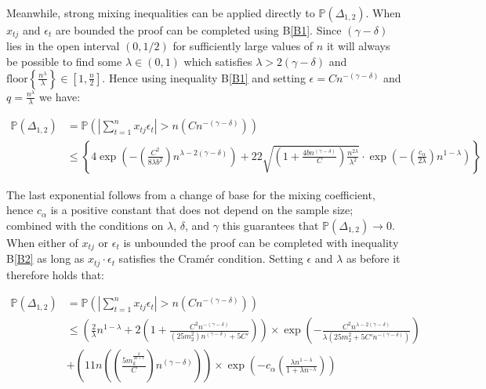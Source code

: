 \documentclass[11pt]{report}\usepackage[utf8]{inputenc}
\begin{document}
Meanwhile, strong mixing inequalities can be applied directly to $\mathbb{P}\left ( \Delta_{1,2} \right )$. When $x_{tj}$ and $\epsilon_t$ are bounded the proof can be completed using B\ref{B1}. Since $( \gamma - \delta)$ lies in the open interval $(0,1/2)$ for sufficiently large values of $n$ it will always be possible to find some $\lambda \in (0,1)$ which satisfies $\lambda > 2( \gamma - \delta)$ and $\text{floor}\left \{ \frac{n^\lambda}{\lambda} \right \} \in \left [ 1, \frac{n}{2} \right ]$. Hence using inequality B\ref{B1} and setting $\epsilon = Cn^{-(\gamma - \delta)}$ and $ q = \frac{n^\lambda}{\lambda}$ we have: 

\begin{align*}
    \mathbb{P}\left ( \Delta_{1,2} \right ) & = \mathbb{P}\left ( \left | \sum_{t=1}^n x_{tj} \epsilon_t \right | > n \left ( Cn^{-( \gamma - \delta)} \right ) \right ) \\
    & \leq \left \{ 4 \exp\left ( -\left ( \frac{C^2}{8\lambda b^2} \right ) n^{\lambda-2(\gamma - \delta)} \right ) + 22 \sqrt{\left( 1 + \frac{4bn^{(\gamma-\delta)}}{C}\right ) \frac{n^{2 \lambda}}{\lambda^2}} \cdot \exp\left ( -\left ( \frac{c_\alpha}{2\lambda} \right ) n^{1-\lambda}  \right ) \right \}
\end{align*}

The last exponential follows from a change of base for the mixing coefficient, hence $c_\alpha$ is a positive constant that does not depend on the sample size; combined with the conditions on $\lambda$, $\delta$, and $\gamma$ this guarantees that $\mathbb{P}\left ( \Delta_{1,2} \right ) \rightarrow 0$. When either of $x_{tj}$ or $\epsilon_t$ is unbounded the proof can be completed with inequality B\ref{B2} as long as $x_{tj} \cdot \epsilon_t$ satisfies the Cramér condition. Setting $\epsilon$ and $\lambda$ as before it therefore holds that: 

\small
\begin{align*}
    \mathbb{P}\left ( \Delta_{1,2} \right ) & = \mathbb{P}\left ( \left | \sum_{t=1}^n x_{tj} \epsilon_t \right | > n \left ( Cn^{-( \gamma - \delta)} \right ) \right ) \\
    & \leq
    \left ( \frac{2}{\lambda}n^{1-\lambda} + 2 \left ( 1 + \frac{C^2n^{-(\gamma-\delta)}}{(25m_2^2)n^{(\gamma - \delta)} + 5C'} \right )\right ) \times \exp\left ( -\frac{C^2n^{\lambda - 2(\gamma - \delta)}}{\lambda \left ( 25m_2^2+5C'n^{-(\gamma-\delta)} \right )} \right ) \\
    & + \left ( 11n \left ( \left ( \frac{5m_k^{\frac{k}{2k+1}}}{C} \right )n^{\left ( \gamma - \delta \right )} \right ) \right ) \times \exp \left ( - c_\alpha\left ( \frac{\lambda n^{1-\lambda}}{1 + \lambda n^{-\lambda}} \right ) \right )
\end{align*}
\normalsize
\end{document}
